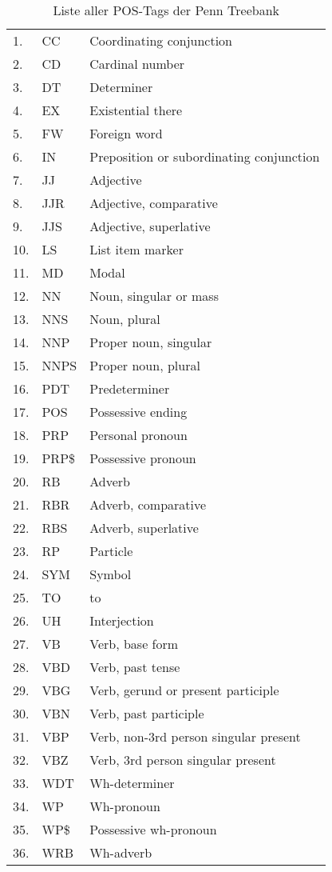 \begin{table}[h!]
\begin{tabular}{|l|l|l|}
     1. & CC & Coordinating conjunction \\
	 2. & CD & Cardinal number\\
	 3. & DT & Determiner \\
	4.&  EX &	Existential there\\
	5.&	FW &	Foreign word\\
	6.&	IN &	Preposition or subordinating conjunction\\
	7.&	JJ &	Adjective\\
	8.&	JJR &	Adjective, comparative\\
	9.&	JJS &	Adjective, superlative\\
	10.& LS &	List item marker\\
	11.& MD &	Modal\\
	12.& NN &	Noun, singular or mass\\
	13.& NNS &	Noun, plural\\
	14.& NNP &	Proper noun, singular\\
	15.& NNPS &	Proper noun, plural\\
	16.& PDT & Predeterminer\\
	17.& POS & Possessive ending\\
	18. & PRP & Personal pronoun \\
	19.& PRP\$ & Possessive pronoun\\
	20.& RB & Adverb\\
	21.& RBR & Adverb, comparative\\
	22.& RBS & Adverb, superlative\\
	23.& RP & Particle\\
	24.& SYM & Symbol\\
	25.& TO & to\\
	26.& UH & Interjection\\
	27.& VB & Verb, base form\\
	28.& VBD & Verb, past tense\\
	29.& VBG & Verb, gerund or present participle\\
	30.& VBN & Verb, past participle\\
	31.& VBP & Verb, non-3rd person singular present\\
	32.& VBZ & Verb, 3rd person singular present\\
	33.& WDT & Wh-determiner\\
	34.& WP & Wh-pronoun\\
	35.& WP\$ & Possessive wh-pronoun\\
	36.& WRB & Wh-adverb	\\
	
	\bottomrule
  \end{tabular}
  \caption{Liste aller POS-Tags der Penn Treebank}
  \label{table:POSTAGS}
\end{table}

